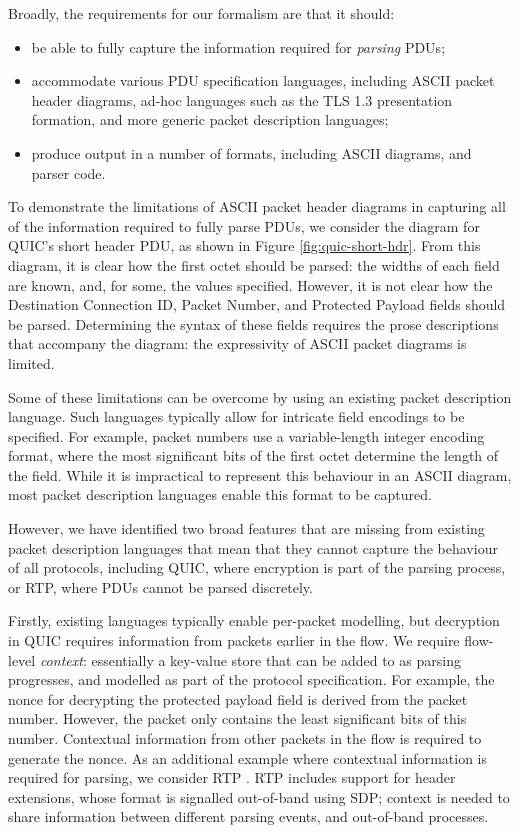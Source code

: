 \documentclass[10pt,sigconf]{acmart}
\begin{document}
Broadly, the requirements for our formalism are that it should:
\begin{itemize}
	\item be able to fully capture the information required for \emph{parsing} PDUs;
	\item accommodate various PDU specification languages, including ASCII
		  packet header diagrams, ad-hoc languages
		  such as the TLS 1.3 presentation formation, and more generic packet description
		  languages;
	\item produce output in a number of formats, including ASCII diagrams, and parser
		  code.
\end{itemize}

To demonstrate the limitations of ASCII packet header diagrams in capturing all of the
information required to fully parse PDUs, we consider the diagram for QUIC's short header
PDU, as shown in Figure \ref{fig:quic-short-hdr}. From this diagram, it is clear how the
first octet should be parsed: the widths of each field are known, and, for some, the
values specified. However, it is not clear how the Destination Connection ID, Packet
Number, and Protected Payload fields should be parsed. Determining the syntax
of these fields requires the prose descriptions that accompany the diagram: the
expressivity of ASCII packet diagrams is limited.

Some of these limitations can be overcome by using an existing packet
description language. Such languages typically allow for intricate field encodings to be
specified. For example, packet numbers use a variable-length integer encoding format,
where the most significant bits of the first octet determine the length of the field.
While it is impractical to represent this behaviour in an ASCII diagram, most packet
description languages enable this format to be captured.

However, we have identified two broad features that are missing from existing packet
description languages that mean that they cannot capture the behaviour of all 
protocols, including QUIC, where
encryption is part of the parsing process, or RTP, where PDUs cannot be parsed discretely.

Firstly, existing languages typically enable per-packet modelling, but decryption in QUIC
requires information from packets earlier in the flow. We require flow-level
\emph{context}: essentially a key-value store that can be added to as parsing progresses,
and modelled as part of the protocol specification. For example, the nonce for decrypting
the protected payload field is derived from the packet number. However, the packet only
contains the least significant bits of this number. Contextual information from other
packets in the flow is required to generate the nonce. As an additional example where 
contextual information is required for parsing, we consider RTP \cite{RFC3550}. RTP
includes support for header extensions, whose format is signalled out-of-band using SDP;
context is needed to share information between different parsing events, and out-of-band
processes.
\end{document}

